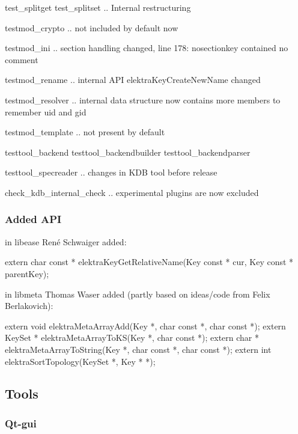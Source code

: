 \begin{DoxyItemize}
\item test\+\_\+splitget test\+\_\+splitset .. Internal restructuring
\item testmod\+\_\+crypto .. not included by default now
\item testmod\+\_\+ini .. section handling changed, line 178\+: {\ttfamily nosectionkey contained no comment}
\item testmod\+\_\+rename .. internal A\+PI elektra\+Key\+Create\+New\+Name changed
\item testmod\+\_\+resolver .. internal data structure now contains more members to remember uid and gid
\item testmod\+\_\+template .. not present by default
\item testtool\+\_\+backend testtool\+\_\+backendbuilder testtool\+\_\+backendparser
\item testtool\+\_\+specreader .. changes in K\+DB tool before release
\item check\+\_\+kdb\+\_\+internal\+\_\+check .. experimental plugins are now excluded
\end{DoxyItemize}

\subsubsection*{Added A\+PI}

in libease René Schwaiger added\+: \begin{DoxyVerb}extern char const * elektraKeyGetRelativeName(Key const * cur, Key const * parentKey);
\end{DoxyVerb}


in libmeta Thomas Waser added (partly based on ideas/code from Felix Berlakovich)\+: \begin{DoxyVerb}extern void elektraMetaArrayAdd(Key *, char const *, char const *);
extern KeySet * elektraMetaArrayToKS(Key *, char const *);
extern char * elektraMetaArrayToString(Key *, char const *, char const *);
extern int elektraSortTopology(KeySet *, Key * *);
\end{DoxyVerb}


\subsection*{Tools}

\subsubsection*{Qt-\/gui}

